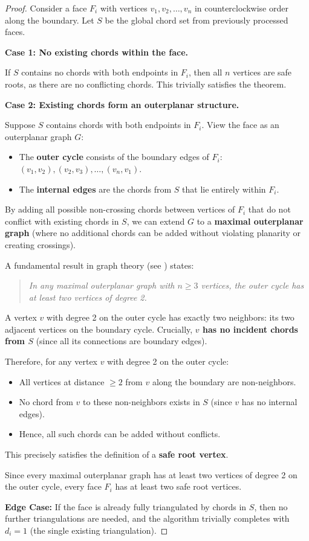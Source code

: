 \documentclass[12pt,a4paper]{article}
\theoremstyle{definition}
\theoremstyle{remark}
\begin{document}
\begin{proof}
Consider a face $F_i$ with vertices $v_1, v_2, \ldots, v_n$ in counterclockwise order along the boundary. Let $S$ be the global chord set from previously processed faces.

\textbf{Case 1: No existing chords within the face.}

If $S$ contains no chords with both endpoints in $F_i$, then all $n$ vertices are safe roots, as there are no conflicting chords. This trivially satisfies the theorem.

\textbf{Case 2: Existing chords form an outerplanar structure.}

Suppose $S$ contains chords with both endpoints in $F_i$. View the face as an outerplanar graph $G$:
\begin{itemize}
    \item The \textbf{outer cycle} consists of the boundary edges of $F_i$: $(v_1, v_2), (v_2, v_3), \ldots, (v_n, v_1)$.
    \item The \textbf{internal edges} are the chords from $S$ that lie entirely within $F_i$.
\end{itemize}

By adding all possible non-crossing chords between vertices of $F_i$ that do not conflict with existing chords in $S$, we can extend $G$ to a \textbf{maximal outerplanar graph} (where no additional chords can be added without violating planarity or creating crossings).

A fundamental result in graph theory (see \cite{diestel2017}) states:
\begin{quote}
\textit{In any maximal outerplanar graph with $n \geq 3$ vertices, the outer cycle has at least two vertices of degree 2.}
\end{quote}

A vertex $v$ with degree 2 on the outer cycle has exactly two neighbors: its two adjacent vertices on the boundary cycle. Crucially, \textbf{$v$ has no incident chords from $S$} (since all its connections are boundary edges).

Therefore, for any vertex $v$ with degree 2 on the outer cycle:
\begin{itemize}
    \item All vertices at distance $\geq 2$ from $v$ along the boundary are non-neighbors.
    \item No chord from $v$ to these non-neighbors exists in $S$ (since $v$ has no internal edges).
    \item Hence, all such chords can be added without conflicts.
\end{itemize}

This precisely satisfies the definition of a \textbf{safe root vertex}.

Since every maximal outerplanar graph has at least two vertices of degree 2 on the outer cycle, every face $F_i$ has at least two safe root vertices.

\textbf{Edge Case:} If the face is already fully triangulated by chords in $S$, then no further triangulations are needed, and the algorithm trivially completes with $d_i = 1$ (the single existing triangulation).
\end{proof}
\end{document}

